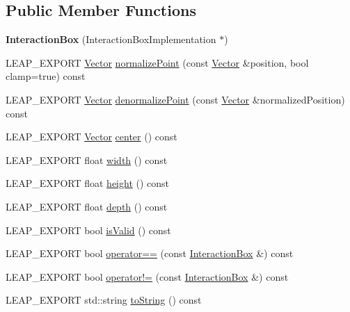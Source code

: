 \subsection*{Public Member Functions}
\begin{DoxyCompactItemize}
\item 
\hypertarget{class_leap_1_1_interaction_box_a4762a10792e968f9d8fb02c8a79d6597}{{\bfseries Interaction\+Box} (Interaction\+Box\+Implementation $\ast$)}\label{class_leap_1_1_interaction_box_a4762a10792e968f9d8fb02c8a79d6597}

\item 
L\+E\+A\+P\+\_\+\+E\+X\+P\+O\+R\+T \hyperlink{struct_leap_1_1_vector}{Vector} \hyperlink{class_leap_1_1_interaction_box_a66ff2e3d02ae3d54ec1b93223c7b9ece}{normalize\+Point} (const \hyperlink{struct_leap_1_1_vector}{Vector} \&position, bool clamp=true) const 
\item 
L\+E\+A\+P\+\_\+\+E\+X\+P\+O\+R\+T \hyperlink{struct_leap_1_1_vector}{Vector} \hyperlink{class_leap_1_1_interaction_box_aa53fc603462adb3008bf7ed795029adb}{denormalize\+Point} (const \hyperlink{struct_leap_1_1_vector}{Vector} \&normalized\+Position) const 
\item 
L\+E\+A\+P\+\_\+\+E\+X\+P\+O\+R\+T \hyperlink{struct_leap_1_1_vector}{Vector} \hyperlink{class_leap_1_1_interaction_box_a674a8aa6308b32b1c85b2d39ee55875d}{center} () const 
\item 
L\+E\+A\+P\+\_\+\+E\+X\+P\+O\+R\+T float \hyperlink{class_leap_1_1_interaction_box_ab373a1adbabe141c0171f3dfa03085f3}{width} () const 
\item 
L\+E\+A\+P\+\_\+\+E\+X\+P\+O\+R\+T float \hyperlink{class_leap_1_1_interaction_box_afdde2aec9590e627e6a16a443ec4f4b7}{height} () const 
\item 
L\+E\+A\+P\+\_\+\+E\+X\+P\+O\+R\+T float \hyperlink{class_leap_1_1_interaction_box_afc9c1a582acba924f97504661ab2cbe3}{depth} () const 
\item 
L\+E\+A\+P\+\_\+\+E\+X\+P\+O\+R\+T bool \hyperlink{class_leap_1_1_interaction_box_a3c2a351d3fc38aebdc630fdb5a6cb846}{is\+Valid} () const 
\item 
L\+E\+A\+P\+\_\+\+E\+X\+P\+O\+R\+T bool \hyperlink{class_leap_1_1_interaction_box_a8d574045866dc11f571efc26cb93347a}{operator==} (const \hyperlink{class_leap_1_1_interaction_box}{Interaction\+Box} \&) const 
\item 
L\+E\+A\+P\+\_\+\+E\+X\+P\+O\+R\+T bool \hyperlink{class_leap_1_1_interaction_box_a1614fb599e63a9639d2ba54dbcf6f3d2}{operator!=} (const \hyperlink{class_leap_1_1_interaction_box}{Interaction\+Box} \&) const 
\item 
L\+E\+A\+P\+\_\+\+E\+X\+P\+O\+R\+T std\+::string \hyperlink{class_leap_1_1_interaction_box_abcd2e64f3ada1678c1de02db9dbba368}{to\+String} () const 
\end{DoxyCompactItemize}
